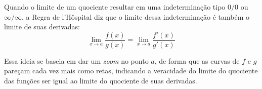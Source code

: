 Quando o limite de um quociente resultar em uma indeterminação tipo $0/0$ ou $\infty/\infty$, a Regra de l'Hôspital diz que o limite dessa indeterminação é também o limite de suas derivadas: $$\lim_{x \rightarrow a} \frac{f(x)}{g(x)} = \lim_{x \rightarrow a} \frac{f'(x)}{g'(x)}$$

Essa ideia se baseia em dar um \textit{zoom} no ponto $a$, de forma que as curvas de $f$ e $g$ pareçam cada vez mais como retas, indicando a veracidade do limite do quociente das funções ser igual ao limite do quociente de suas derivadas.